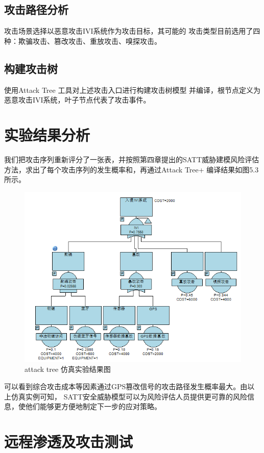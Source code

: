 \subsection{攻击路径分析}
攻击场景选择以恶意攻击IVI系统作为攻击目标，其可能的
攻击类型目前选用了四种：欺骗攻击、篡改攻击、重放攻击、嗅探攻击。
\subsection{构建攻击树}
使用Attack Tree 工具对上述攻击入口进行构建攻击树模型
并编译，根节点定义为恶意攻击IVI系统，叶子节点代表了攻击事件。

\section{实验结果分析}
我们把攻击序列重新评分了一张表，并按照第四章提出的SATT威胁建模风险评估方法，求出了每个攻击序列的发生概率和，再通过Attack Tree+ 编译结果如图5.3所示。
\begin{figure}
  \centering
  \includegraphics[scale=1]{resources/img/result.pic.jpg}
  \caption{attack tree 仿真实验结果图}
\end{figure}
可以看到综合攻击成本等因素通过GPS篡改信号的攻击路径发生概率最大。由以上仿真实例可知，
SATT安全威胁模型可以为风险评估人员提供更可靠的风险信息，使他们能够更方便地制定下一步的应对策略。

\section{远程渗透及攻击测试}

